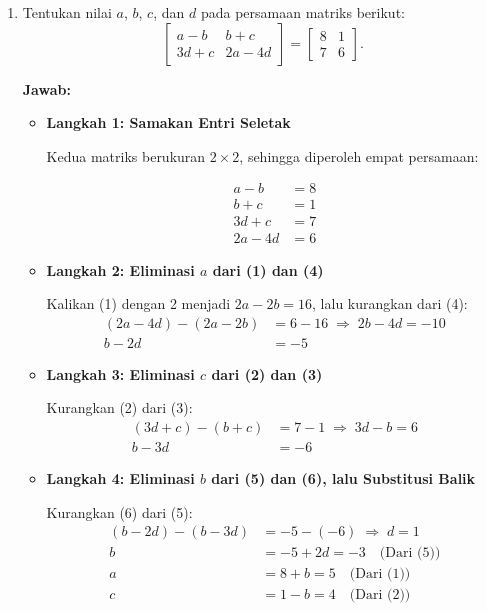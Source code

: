 \documentclass[10pt,a4paper]{article}
\newcounter{eqblock}
\newcommand{\reseteq}{%
  \stepcounter{eqblock}%
  \setcounter{equation}{0}%
  \renewcommand{\theHequation}{\arabic{eqblock}.\arabic{equation}}%
}
\begin{document}
\begin{enumerate}
\begin{enumerate}
\end{enumerate}

\item Tentukan nilai $a$, $b$, $c$, dan $d$ pada persamaan matriks berikut:
\[
\begin{bmatrix} a - b & b + c \\ 3d + c & 2a - 4d \end{bmatrix} = \begin{bmatrix} 8 & 1 \\ 7 & 6 \end{bmatrix}.
\]

\textbf{Jawab:}
\begin{itemize}
\item \textbf{Langkah 1: Samakan Entri Seletak}

Kedua matriks berukuran $2 \times 2$, sehingga diperoleh empat persamaan:
\reseteq
\begin{align}
a - b &= 8 \\
b + c &= 1 \\
3d + c &= 7 \\
2a - 4d &= 6
\end{align}

\item \textbf{Langkah 2: Eliminasi $a$ dari (1) dan (4)}

Kalikan (1) dengan 2 menjadi $2a - 2b = 16$, lalu kurangkan dari (4):
\begin{align}
(2a - 4d) - (2a - 2b) &= 6 - 16 \;\Rightarrow\; 2b - 4d = -10 \nonumber \\
b - 2d &= -5
\end{align}

\item \textbf{Langkah 3: Eliminasi $c$ dari (2) dan (3)}

Kurangkan (2) dari (3):
\begin{align}
(3d + c) - (b + c) &= 7 - 1 \;\Rightarrow\; 3d - b = 6 \nonumber \\
b - 3d &= -6
\end{align}

\item \textbf{Langkah 4: Eliminasi $b$ dari (5) dan (6), lalu Substitusi Balik}

Kurangkan (6) dari (5):
\begin{align}
(b - 2d) - (b - 3d) &= -5 - (-6) \;\Rightarrow\; d = 1 \nonumber \\
b &= -5 + 2d = -3 \quad \text{(Dari (5))} \nonumber \\
a &= 8 + b = 5 \quad \text{(Dari (1))} \nonumber \\
c &= 1 - b = 4 \quad \text{(Dari (2))} \nonumber
\end{align}


\end{itemize}
\end{enumerate}
\end{document}
